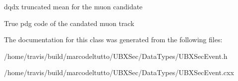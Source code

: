 dqdx truncated mean for the muon candidate 

True pdg code of the candated muon track 

The documentation for this class was generated from the following files\-:\begin{DoxyCompactItemize}
\item 
/home/travis/build/marcodeltutto/\-U\-B\-X\-Sec/\-Data\-Types/U\-B\-X\-Sec\-Event.\-h\item 
/home/travis/build/marcodeltutto/\-U\-B\-X\-Sec/\-Data\-Types/U\-B\-X\-Sec\-Event.\-cxx\end{DoxyCompactItemize}
